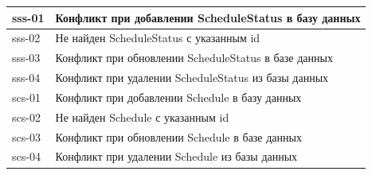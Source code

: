 \documentclass[a4paper,article]{article}
\begin{document}
\begin{sloppypar}
\begin{appendices}
\begin{xltabular}{\textwidth} { |
                >{\hsize} X |
                >{\hsize} X | }
            \hline
            sss-01
            & Конфликт при добавлении ScheduleStatus в базу данных \\
            
            \hline
            sss-02
            & Не найден ScheduleStatus с указанным id \\
            
            \hline
            sss-03
            & Конфликт при обновлении ScheduleStatus в базе данных \\
            
            \hline
            sss-04
            & Конфликт при удалении ScheduleStatus из базы данных \\
            
            \hline
            scs-01
            & Конфликт при добавлении Schedule в базу данных \\
            
            \hline
            scs-02
            & Не найден Schedule с указанным id \\
            
            \hline
            scs-03
            & Конфликт при обновлении Schedule в базе данных \\
            
            \hline
            scs-04
            & Конфликт при удалении Schedule из базы данных \\
            
            \hline
        \end{xltabular}
        
        \newpage
        

\end{appendices}
\end{sloppypar}
\end{document}
